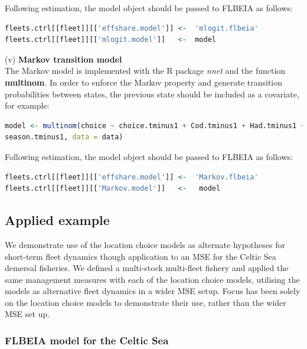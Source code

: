 \documentclass[12pt, halfline, a4paper]{ouparticle}
\begin{document}
Following estimation, the model object should be passed to FLBEIA as follows:

\begin{lstlisting}[language=R]
fleets.ctrl[[fleet]][['effshare.model']] <-  'mlogit.flbeia'
fleets.ctrl[[fleet]][['mlogit.model']]   <-  model 
\end{lstlisting}

(v) \textbf{Markov transition model} \\

The Markov model is implemented with the R package \textit{nnet} and the
function \textbf{multinom}. In order to enforce the Markov property and
generate transition probabilities between states, the previous state should be
included as a covariate, for example:

\begin{lstlisting}[language=R]
model <- multinom(choice ~ choice.tminus1 + Cod.tminus1 + Had.tminus1 +
season.tminus1, data = data)
\end{lstlisting}

Following estimation, the model object should be passed to FLBEIA as follows:

\begin{lstlisting}[language=R]
fleets.ctrl[[fleet]][['effshare.model']] <-  'Markov.flbeia'
fleets.ctrl[[fleet]][['Markov.model']]   <-   model 
\end{lstlisting}

\subsection{Applied example}

We demonstrate use of the location choice models as alternate hypotheses for
short-term fleet dynamics though application to an MSE for the Celtic Sea
demersal fisheries. We defined a multi-stock multi-fleet fishery and applied
the same management measures with each of the location choice models, utilising
the models as alternative fleet dynamics in a wider MSE setup. Focus has been
solely on the location choice models to demonstrate their use, rather than the
wider MSE set up.

\subsubsection{FLBEIA model for the Celtic Sea}
\end{document}
